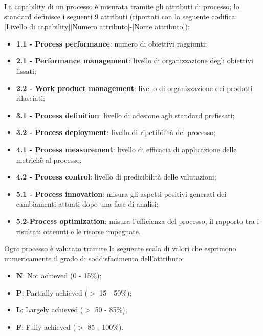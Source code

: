 La capability di un processo è misurata tramite gli attributi di processo; lo standard\G{} definisce i seguenti 9 attributi
(riportati con la seguente codifica: [Livello di capability][Numero attributo]-[Nome attributo]):
\begin{itemize}
	\item \textbf{1.1 - Process performance}: numero di obiettivi raggiunti;
	\item \textbf{2.1 - Performance management}: livello di organizzazione degli obiettivi fissati;
	\item \textbf{2.2 - Work product management}: livello di organizzazione dei prodotti rilasciati;
	\item \textbf{3.1 - Process definition}: livello di adesione agli standard prefissati;
	\item \textbf{3.2 - Process deployment}: livello di ripetibilità del processo;
	\item \textbf{4.1 - Process measurement}: livello di efficacia di applicazione delle metriche\G{} al processo;
	\item \textbf{4.2 - Process control}: livello di predicibilità delle valutazioni;
	\item \textbf{5.1 - Process innovation}: misura gli aspetti positivi generati dei cambiamenti attuati dopo una
	fase di analisi;
	\item \textbf{5.2-Process optimization}: misura l'efficienza del processo, il rapporto tra i risultati ottenuti e
	le risorse impegnate.
\end{itemize}

Ogni processo è valutato tramite la seguente scala di valori che esprimono numericamente il grado di
soddisfacimento dell'attributo:
\begin{itemize}
	\item \textbf{N}: Not achieved (0 - 15\%);
	\item \textbf{P}: Partially achieved ($>$ 15 - 50\%);
	\item \textbf{L}: Largely achieved ($>$ 50 - 85\%);
	\item \textbf{F}: Fully achieved ($>$ 85 - 100\%).
\end{itemize}
